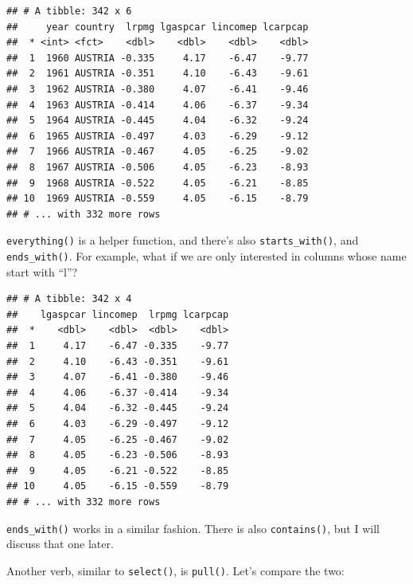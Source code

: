 \documentclass[]{gitbook}
\newenvironment{Shaded}{\begin{snugshade}}{\end{snugshade}}
\newcommand{\KeywordTok}[1]{\textcolor[rgb]{0.13,0.29,0.53}{\textbf{#1}}}
\newcommand{\NormalTok}[1]{#1}
\newcommand{\OperatorTok}[1]{\textcolor[rgb]{0.81,0.36,0.00}{\textbf{#1}}}
\newcommand{\StringTok}[1]{\textcolor[rgb]{0.31,0.60,0.02}{#1}}
\theoremstyle{definition}
\theoremstyle{definition}
\theoremstyle{definition}
\theoremstyle{remark}
\begin{document}
\begin{verbatim}
## # A tibble: 342 x 6
##     year country  lrpmg lgaspcar lincomep lcarpcap
##  * <int> <fct>    <dbl>    <dbl>    <dbl>    <dbl>
##  1  1960 AUSTRIA -0.335     4.17    -6.47    -9.77
##  2  1961 AUSTRIA -0.351     4.10    -6.43    -9.61
##  3  1962 AUSTRIA -0.380     4.07    -6.41    -9.46
##  4  1963 AUSTRIA -0.414     4.06    -6.37    -9.34
##  5  1964 AUSTRIA -0.445     4.04    -6.32    -9.24
##  6  1965 AUSTRIA -0.497     4.03    -6.29    -9.12
##  7  1966 AUSTRIA -0.467     4.05    -6.25    -9.02
##  8  1967 AUSTRIA -0.506     4.05    -6.23    -8.93
##  9  1968 AUSTRIA -0.522     4.05    -6.21    -8.85
## 10  1969 AUSTRIA -0.559     4.05    -6.15    -8.79
## # ... with 332 more rows
\end{verbatim}

\texttt{everything()} is a helper function, and there's also
\texttt{starts\_with()}, and \texttt{ends\_with()}. For example, what if
we are only interested in columns whose name start with ``l''?

\begin{Shaded}
\end{Shaded}

\begin{verbatim}
## # A tibble: 342 x 4
##    lgaspcar lincomep  lrpmg lcarpcap
##  *    <dbl>    <dbl>  <dbl>    <dbl>
##  1     4.17    -6.47 -0.335    -9.77
##  2     4.10    -6.43 -0.351    -9.61
##  3     4.07    -6.41 -0.380    -9.46
##  4     4.06    -6.37 -0.414    -9.34
##  5     4.04    -6.32 -0.445    -9.24
##  6     4.03    -6.29 -0.497    -9.12
##  7     4.05    -6.25 -0.467    -9.02
##  8     4.05    -6.23 -0.506    -8.93
##  9     4.05    -6.21 -0.522    -8.85
## 10     4.05    -6.15 -0.559    -8.79
## # ... with 332 more rows
\end{verbatim}

\texttt{ends\_with()} works in a similar fashion. There is also
\texttt{contains()}, but I will discuss that one later.

Another verb, similar to \texttt{select()}, is \texttt{pull()}. Let's
compare the two:

\begin{Shaded}
\end{Shaded}
\end{document}
